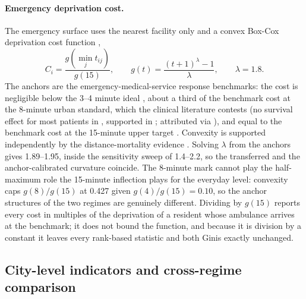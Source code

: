 \documentclass[11pt]{article}
\begin{document}
\paragraph{Emergency deprivation cost.} The emergency surface uses the
nearest facility only and a convex Box-Cox deprivation cost function
\citep{cantillo2018discrete,delgadolindeman2019ambulance},
\begin{equation}
C_i = \frac{g(\min_j t_{ij})}{g(15)}, \qquad
g(t) = \frac{(t + 1)^{\lambda} - 1}{\lambda}, \qquad \lambda = 1.8 .
\label{eq:dcf}
\end{equation}
The anchors are the emergency-medical-service response benchmarks: the
cost is negligible below the 3--4 minute ideal
\citep{pons2005response,vo2020vulnerable}, about a third of the benchmark
cost at the 8-minute urban standard, which the clinical literature
contests (no survival effect for most patients in \citep{pons2005response},
supported in \citep{blanchard2012response}; attributed via
\citep{khan2026melbourne}), and equal to the benchmark cost at the
15-minute upper target \citep{peleg2004ems,khan2026melbourne}. Convexity
is supported independently by the distance-mortality evidence
\citep{nicholl2007distance}. Solving $\lambda$ from the anchors gives
1.89--1.95, inside the sensitivity sweep of 1.4--2.2, so the transferred
and the anchor-calibrated curvature coincide. The 8-minute mark cannot
play the half-maximum role the 15-minute inflection plays for the everyday
level: convexity caps $g(8)/g(15)$ at 0.427 given $g(4)/g(15) = 0.10$, so
the anchor structures of the two regimes are genuinely different. Dividing
by $g(15)$ reports every cost in multiples of the deprivation of a
resident whose ambulance arrives at the benchmark; it does not bound the
function, and because it is division by a constant it leaves every
rank-based statistic and both Ginis exactly unchanged.

\subsection{City-level indicators and cross-regime comparison}\label{sec:m-indicators}
\end{document}
